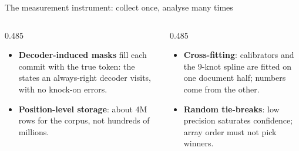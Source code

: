 \documentclass[aspectratio=169,10pt,t]{beamer}
\begin{document}
\begin{frame}{The measurement instrument: collect once, analyse many times}
\begin{tikzpicture}
  \end{tikzpicture}
  \par\vspace{1.5mm}\raggedright
  \begin{columns}[T,onlytextwidth]
    \begin{column}{0.485\textwidth}
      \begin{itemize}\footnotesize
        \item \textbf{Decoder-induced masks} fill each commit with the true token: the
              states an always-right decoder visits, with no knock-on errors.
        \item \textbf{Position-level storage}: about 4M rows for the corpus, not hundreds
              of millions.
      \end{itemize}
    \end{column}
    \begin{column}{0.485\textwidth}
      \begin{itemize}\footnotesize
        \item \textbf{Cross-fitting}: calibrators and the 9-knot spline are fitted on one
              document half; numbers come from the other.
        \item \textbf{Random tie-breaks}: low precision saturates confidence; array order
              must not pick winners.
      \end{itemize}
    \end{column}
  \end{columns}
\end{frame}
\end{document}
